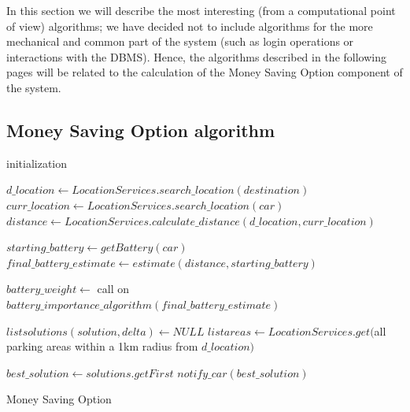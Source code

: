 In this section we will describe the most interesting (from a computational point of view) algorithms; we have decided not to include algorithms for the more mechanical and common part of the system (such as login operations or interactions with the DBMS). Hence, the algorithms described in the following pages will be related to the calculation of the Money Saving Option component of the system.

\subsection{Money Saving Option algorithm}

\begin{algorithm}[H]
	initialization\;
	
	$d\_location \leftarrow LocationServices.search\_location(destination)$\;
	$curr\_location \leftarrow LocationServices.search\_location(car)$\;
	$distance \leftarrow LocationServices.calculate\_distance (d\_location, curr\_location)$\;
	
	$starting\_battery \leftarrow getBattery(car)$\;
	$final\_battery\_estimate \leftarrow estimate(distance, starting\_battery)$\;
	
	$battery\_weight \leftarrow$ call on $battery\_importance\_algorithm(final\_battery\_estimate)$\;
	
	$list solutions(solution, delta) \leftarrow NULL$\;
	$list areas \leftarrow LocationServices.get($all parking areas within a 1km radius from $d\_location)$\;
	
	
	$best\_solution \leftarrow solutions.getFirst$\;
	$notify\_car(best\_solution)$\;
	
	\caption{Money Saving Option}
\end{algorithm}

